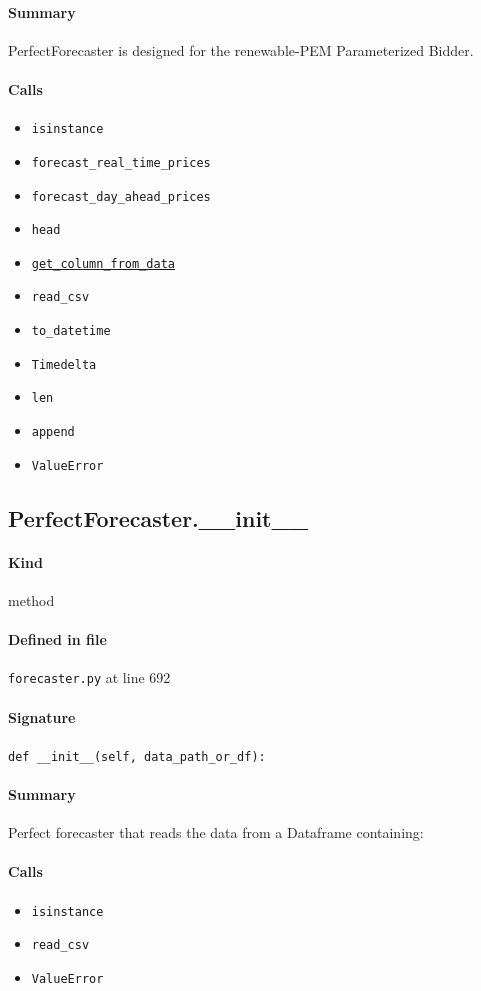 \documentclass[11pt]{report}
\begin{document}
\paragraph{Summary} PerfectForecaster is designed for the renewable-PEM Parameterized Bidder.
\paragraph{Calls}
\begin{itemize}[leftmargin=*]
  \item \texttt{isinstance}
  \item \texttt{forecast\_real\_time\_prices}
  \item \texttt{forecast\_day\_ahead\_prices}
  \item \texttt{head}
  \item \hyperref[def:forecaster.py:PerfectForecaster.get_column_from_data:L762]{\texttt{get\_column\_from\_data}}
  \item \texttt{read\_csv}
  \item \texttt{to\_datetime}
  \item \texttt{Timedelta}
  \item \texttt{len}
  \item \texttt{append}
  \item \texttt{ValueError}
\end{itemize}
\subsection{PerfectForecaster.\_\_init\_\_}
\label{def:forecaster.py:PerfectForecaster.__init__:L692}
\paragraph{Kind} method
\paragraph{Defined in file} \texttt{forecaster.py} at line 692
\paragraph{Signature} \texttt{def \_\_init\_\_(self, data\_path\_or\_df):}
\paragraph{Summary} Perfect forecaster that reads the data from a Dataframe containing:
\paragraph{Calls}
\begin{itemize}[leftmargin=*]
  \item \texttt{isinstance}
  \item \texttt{read\_csv}
  \item \texttt{ValueError}
\end{itemize}
\end{document}
